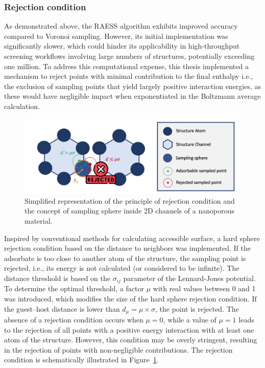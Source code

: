 \documentclass[main]{subfiles}
\begin{document}
\subsubsection{Rejection condition}\label{sct:rejection_condition}

As demonstrated above, the RAESS algorithm exhibits improved accuracy compared to Voronoi sampling. However, its initial implementation was significantly slower, which could hinder its applicability in high-throughput screening workflows involving large numbers of structures, potentially exceeding one million. To address this computational expense, this thesis implemented a mechanism to reject points with minimal contribution to the final enthalpy i.e., the exclusion of sampling points that yield largely positive interaction energies, as these would have negligible impact when exponentiated in the Boltzmann average calculation.

\begin{figure}[ht]
\centering
  \includegraphics[width=\linewidth]{figures/3-fastsim/rejection_sampling_sphere.jpg}
  \caption{Simplified representation of the principle of rejection condition and the concept of sampling sphere inside 2D channels of a nanoporous material.}\label{fgr:feature}
\end{figure}

Inspired by conventional methods for calculating accessible surface, a hard sphere rejection condition based on the distance to neighbors was implemented. If the adsorbate is too close to another atom of the structure, the sampling point is rejected, i.e., its energy is not calculated (or considered to be infinite). The distance threshold is based on the $\sigma_{ij}$ parameter of the Lennard-Jones potential. To determine the optimal threshold, a factor $\mu$ with real values between 0 and 1 was introduced, which modifies the size of the hard sphere rejection condition. If the guest--host distance is lower than $d_{\mu} = \mu \times \sigma$, the point is rejected. The absence of a rejection condition occurs when $\mu = 0$, while a value of $\mu = 1$ leads to the rejection of all points with a positive energy interaction with at least one atom of the structure. However, this condition may be overly stringent, resulting in the rejection of points with non-negligible contributions. The rejection condition is schematically illustrated in Figure~\ref{fgr:feature}.
\end{document}
